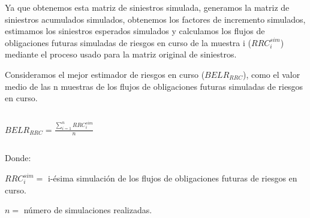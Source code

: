 \documentclass[11pt,twoside,openright,spanish]{report}
\numberwithin{equation}{chapter}
\numberwithin{figure}{chapter}
\numberwithin{table}{chapter}
\begin{document}
Ya que obtenemos esta matriz de siniestros simulada, generamos la matriz de siniestros acumulados simulados, obtenemos los factores de incremento simulados, estimamos los siniestros esperados simulados y calculamos los flujos de obligaciones futuras simuladas de riesgos en curso de la muestra i ($RRC_{i}^{sim}$) mediante el proceso usado para la matriz original de siniestros.
	
	\doublespacing
	
	Consideramos el mejor estimador de riesgos en curso ($BELR_{RRC}$), como el valor medio de las n muestras de los flujos de obligaciones futuras simuladas de riesgos en curso.


	\doublespacing

$ $

\doublespacing
	
		{\centering
		$BELR_{RRC}^{}=\frac{\sum _{i=1}^{n}RRC_{i}^{sim}}{n}$
		\noindent
			
	}
	
	\doublespacing

$ $

\doublespacing
	
	Donde:
	
	\doublespacing
	
	$RRC_{i}^{sim}=$ i-ésima simulación de los flujos de obligaciones futuras de riesgos en curso.
	
	$n=$ número de simulaciones realizadas.
\begin{comment}	
	\doublespacing
	Para Salud Individual Dental, el $BELR_{RRC}$ se calculará como el producto de la prima de tarifa no devengada y el factor de siniestralidad última de mercado proporcionado por la Comisión Nacional de Seguros y Fianzas:


	\doublespacing

$ $

\doublespacing
	
	
	{\centering
		$BELR_{RRC}^{}=PTND_{} \cdot FS_{BEL}^{RRC}$
		\noindent
		
	}
	
	\doublespacing

$ $

\doublespacing
	
	Donde:
	
	\doublespacing
	
	$PTND_{}=$ Prima de tarifa no devengada.
\begin{comment}	
	$FS_{BEL}^{RRC}=$ Factor de Siniestralidad última con información de mercado.
	
	\doublespacing

$ $

\doublespacing

	El cálculo del $BELR_{RRC}$, se realizará de forma trimestral y se prorrateara con el vigor de la valuación del cierre de mes a fin de obtener la reserva de riesgos en curso.

\end{comment}
	
\end{document}
